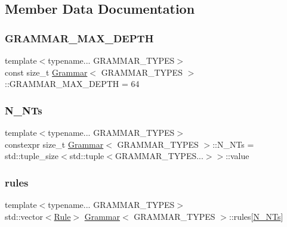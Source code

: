 \subsection{Member Data Documentation}
\mbox{\label{class_grammar_a4a0d1d38426ce7f1b68c001e9ddec064}} 
\subsubsection{\texorpdfstring{G\+R\+A\+M\+M\+A\+R\+\_\+\+M\+A\+X\+\_\+\+D\+E\+P\+TH}{GRAMMAR\_MAX\_DEPTH}}
{\footnotesize\ttfamily template$<$typename... G\+R\+A\+M\+M\+A\+R\+\_\+\+T\+Y\+P\+ES$>$ \\
const size\+\_\+t \hyperlink{class_grammar}{Grammar}$<$ G\+R\+A\+M\+M\+A\+R\+\_\+\+T\+Y\+P\+ES $>$\+::G\+R\+A\+M\+M\+A\+R\+\_\+\+M\+A\+X\+\_\+\+D\+E\+P\+TH = 64\hspace{0.3cm}{\ttfamily [static]}}

\mbox{\label{class_grammar_a45877d4d7a5ee98bf6753af593d6ca08}} 
\subsubsection{\texorpdfstring{N\+\_\+\+N\+Ts}{N\_NTs}}
{\footnotesize\ttfamily template$<$typename... G\+R\+A\+M\+M\+A\+R\+\_\+\+T\+Y\+P\+ES$>$ \\
constexpr size\+\_\+t \hyperlink{class_grammar}{Grammar}$<$ G\+R\+A\+M\+M\+A\+R\+\_\+\+T\+Y\+P\+ES $>$\+::N\+\_\+\+N\+Ts = std\+::tuple\+\_\+size$<$std\+::tuple$<$G\+R\+A\+M\+M\+A\+R\+\_\+\+T\+Y\+P\+E\+S...$>$$>$\+::value\hspace{0.3cm}{\ttfamily [static]}}

\mbox{\label{class_grammar_a8a89ced0753d72f52ccf2b04c0ccc82b}} 
\subsubsection{\texorpdfstring{rules}{rules}}
{\footnotesize\ttfamily template$<$typename... G\+R\+A\+M\+M\+A\+R\+\_\+\+T\+Y\+P\+ES$>$ \\
std\+::vector$<$\hyperlink{class_rule}{Rule}$>$ \hyperlink{class_grammar}{Grammar}$<$ G\+R\+A\+M\+M\+A\+R\+\_\+\+T\+Y\+P\+ES $>$\+::rules\mbox{[}\hyperlink{class_grammar_a45877d4d7a5ee98bf6753af593d6ca08}{N\+\_\+\+N\+Ts}\mbox{]}}

